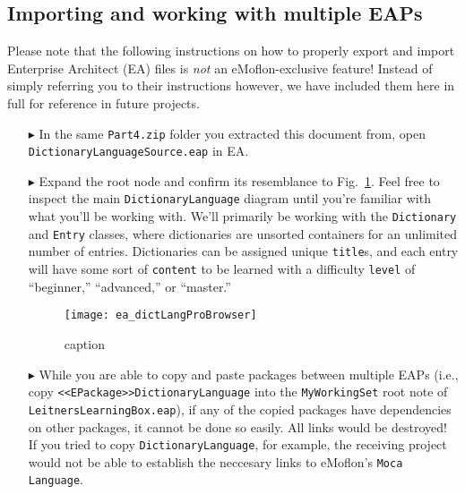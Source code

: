 \newpage
\subsection{Importing and working with multiple EAPs}
\visHeader
\label{sec:multiEAP}

Please note that the following instructions on how to properly export and import Enterprise Architect (EA) files is \emph{not} an eMoflon-exclusive feature!
Instead of simply referring you to their instructions however, we have included them here in full for reference in future projects.

\begin{itemize}

\item[$\blacktriangleright$] In the same \texttt{Part4.zip} folder you extracted this document from, open \texttt{DictionaryLanguageSource.eap} in EA.

\item[$\blacktriangleright$] Expand the root node and confirm its resemblance to Fig.~\ref{fig:dictionaryLangStart}. Feel free to inspect the main
\texttt{DictionaryLanguage} diagram until you're familiar with what you'll be working with. We'll primarily be working with the \texttt{Dictionary} and
\texttt{Entry} classes, where dictionaries are unsorted containers for an unlimited number of entries. Dictionaries can be assigned unique \texttt{title}s,
and each entry will have some sort of \texttt{content} to be learned with a difficulty \texttt{level} of ``beginner,'' ``advanced,'' or ``master.''

\vspace{0.5cm}

\begin{figure}[htbp]
\begin{center}
  \texttt{[image: ea\_dictLangProBrowser]}
  \caption{caption}
  \label{fig:dictionaryLangStart}
\end{center}
\end{figure}

\item[$\blacktriangleright$] While you are able to copy and paste packages between multiple EAPs (i.e., copy \texttt{<<EPack\-age>>DictionaryLanguage} into the
\texttt{MyWorkingSet} root note of \texttt{Leit\-nersLearningBox.eap}), if any of the copied packages have dependencies on other packages, it cannot be done so
easily. All links would be destroyed! If you tried to copy \texttt{DictionaryLanguage}, for example, the receiving project would not be able to establish the
neccesary links to eMoflon's \texttt{Moca Language}.


\end{itemize}
